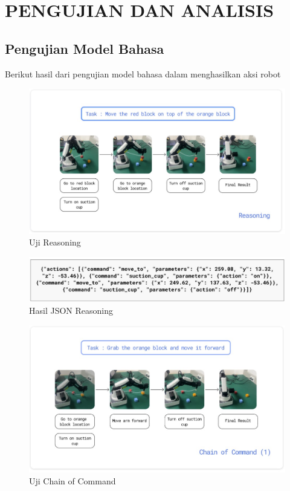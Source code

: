 \chapter{PENGUJIAN DAN ANALISIS}
\label{chap:pengujiananalisis}


\section{Pengujian Model Bahasa}
Berikut hasil dari pengujian model bahasa dalam menghasilkan aksi robot
\begin{figure} [H] \centering
  \includegraphics[scale=0.45]{gambar/uji_res.jpg}
  \caption{Uji Reasoning}
\end{figure}

\begin{figure} [H] \centering
  \includegraphics[scale=0.5]{gambar/js1.jpg}
  \caption{Hasil JSON Reasoning}
\end{figure}


\begin{figure} [H] \centering
  \includegraphics[scale=0.45]{gambar/ujicoc.jpg}
  \caption{Uji Chain of Command}
\end{figure}

